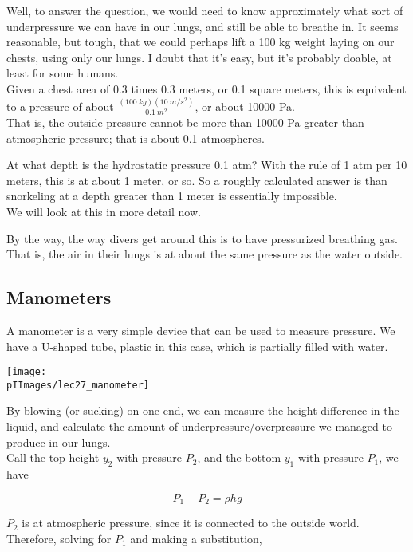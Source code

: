 Well, to answer the question, we would need to know approximately what sort of underpressure we can have in our lungs, and still be able to breathe in. It seems reasonable, but tough, that we could perhaps lift a 100 kg weight laying on our chests, using only our lungs. I doubt that it's easy, but it's probably doable, at least for some humans.\\
Given a chest area of 0.3 times 0.3 meters, or 0.1 square meters, this is equivalent to a pressure of about $\displaystyle \frac{(\SI{100}{kg})(\SI{10}{m/s^2})}{\SI{0.1}{m^2}}$, or about 10000 Pa.\\
That is, the outside pressure cannot be more than 10000 Pa greater than atmospheric pressure; that is about 0.1 atmospheres.

At what depth is the hydrostatic pressure 0.1 atm? With the rule of 1 atm per 10 meters, this is at about 1 meter, or so. So a roughly calculated answer is than snorkeling at a depth greater than 1 meter is essentially impossible.\\
We will look at this in more detail now.

By the way, the way divers get around this is to have pressurized breathing gas. That is, the air in their lungs is at about the same pressure as the water outside.

\subsection{Manometers}

A manometer is a very simple device that can be used to measure pressure. We have a U-shaped tube, plastic in this case, which is partially filled with water.

\begin{center}
\texttt{[image: \\pIImages/lec27\_manometer]}
\end{center}

By blowing (or sucking) on one end, we can measure the height difference in the liquid, and calculate the amount of underpressure/overpressure we managed to produce in our lungs.\\
Call the top height $y_2$ with pressure $P_2$, and the bottom $y_1$ with pressure $P_1$, we have

\begin{equation}
P_1 - P_2 = \rho h g
\end{equation}

$P_2$ is at atmospheric pressure, since it is connected to the outside world. Therefore, solving for $P_1$ and making a substitution,

